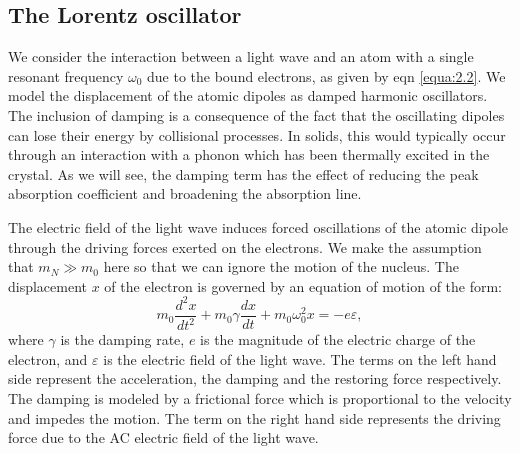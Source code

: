 \documentclass[12pt]{book}
\begin{document}
\subsection{The Lorentz oscillator}
We consider the interaction between a light wave and an atom with a single resonant frequency $\omega_0$ due to the bound electrons, as given by eqn \ref{equa:2.2}. We model the displacement of the atomic dipoles as damped harmonic oscillators. The inclusion of damping is a consequence of the fact that the oscillating dipoles can lose their energy by collisional processes. In solids, this would typically occur through an interaction with a phonon which has been thermally excited in the crystal. As we will see, the damping term has the effect of reducing the peak absorption coefficient and broadening the absorption line.


The electric field of the light wave induces forced oscillations of the atomic dipole through the driving forces exerted on the electrons. We make the assumption that $m_N\gg m_0$ here so that we can ignore the motion of the nucleus. The displacement $x$ of the electron is governed by an equation of motion of the form:
\begin{equation}\label{equa:2.5}
  m_0\frac{d^2x}{dt^2}+m_0\gamma\frac{dx}{dt}+m_0\omega_0^2x=-e\varepsilon,
\end{equation}
where $\gamma$ is the damping rate, $e$ is the magnitude of the electric charge of the electron, and $\varepsilon$ is the electric field of the light wave. The terms on the left hand side represent the acceleration, the damping and the restoring force respectively. The damping is modeled by a frictional force which is proportional to the velocity and impedes the motion. The term on the right hand side represents the driving force due to the AC electric field of the light wave.
\end{document}
